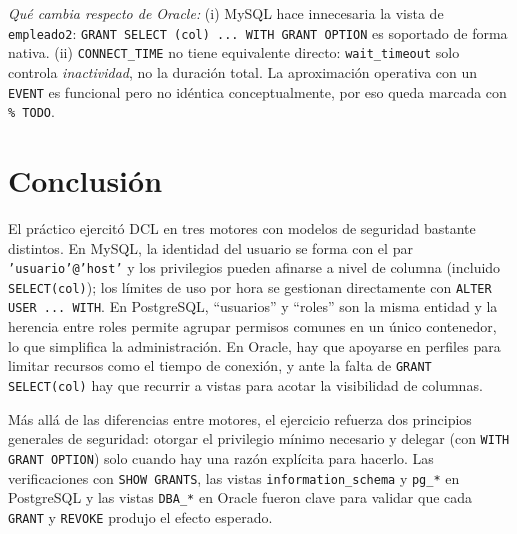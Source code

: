 \documentclass[11pt,a4paper]{article}
\begin{document}
\textit{Qué cambia respecto de Oracle:} (i) MySQL hace innecesaria la vista de \texttt{empleado2}: \texttt{GRANT SELECT (col) ... WITH GRANT OPTION} es soportado de forma nativa. (ii) \texttt{CONNECT\_TIME} no tiene equivalente directo: \texttt{wait\_timeout} solo controla \emph{inactividad}, no la duración total. La aproximación operativa con un \texttt{EVENT} es funcional pero no idéntica conceptualmente, por eso queda marcada con \texttt{\% TODO}.

\section{Conclusión}

El práctico ejercitó DCL en tres motores con modelos de seguridad bastante distintos. En MySQL, la identidad del usuario se forma con el par \texttt{'usuario'@'host'} y los privilegios pueden afinarse a nivel de columna (incluido \texttt{SELECT(col)}); los límites de uso por hora se gestionan directamente con \texttt{ALTER USER ... WITH}. En PostgreSQL, ``usuarios'' y ``roles'' son la misma entidad y la herencia entre roles permite agrupar permisos comunes en un único contenedor, lo que simplifica la administración. En Oracle, hay que apoyarse en perfiles para limitar recursos como el tiempo de conexión, y ante la falta de \texttt{GRANT SELECT(col)} hay que recurrir a vistas para acotar la visibilidad de columnas.

Más allá de las diferencias entre motores, el ejercicio refuerza dos principios generales de seguridad: otorgar el privilegio mínimo necesario y delegar (con \texttt{WITH GRANT OPTION}) solo cuando hay una razón explícita para hacerlo. Las verificaciones con \texttt{SHOW GRANTS}, las vistas \texttt{information\_schema} y \texttt{pg\_*} en PostgreSQL y las vistas \texttt{DBA\_*} en Oracle fueron clave para validar que cada \texttt{GRANT} y \texttt{REVOKE} produjo el efecto esperado.
\end{document}
